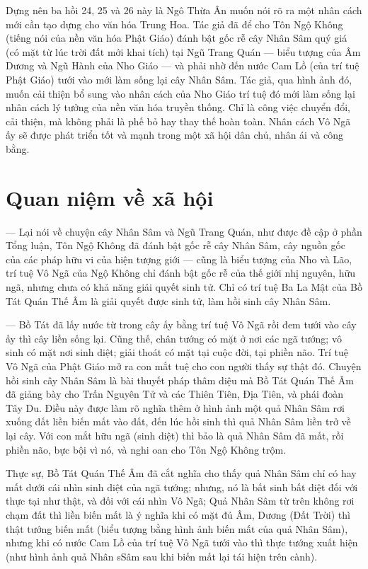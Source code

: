 Dựng nên ba hồi 24, 25 và 26 này là Ngô Thừa Ân muốn nói rõ ra một nhân cách mới cần tạo dựng cho văn hóa Trung Hoa. Tác giả đã để cho Tôn Ngộ Không (tiếng nói của nền văn hóa Phật Giáo) đánh bật gốc rễ cây Nhân Sâm quý giá (có mặt từ lúc trời đất mới khai tích) tại Ngũ Trang Quán — biểu tượng của Âm Dương và Ngũ Hành của Nho Giáo — và phải nhờ đến nước Cam Lồ (của trí tuệ Phật Giáo) tưới vào mới làm sống lại cây Nhân Sâm. Tác giả, qua hình ảnh đó, muốn cải thiện bổ sung vào nhân cách của Nho Giáo trí tuệ đó mới làm sống lại nhân cách lý tưởng của nền văn hóa truyền thống. Chỉ là công việc chuyển đổi, cải thiện, mà không phải là phế bỏ hay thay thế hoàn toàn. Nhân cách Vô Ngã ấy sẽ được phát triển tốt và mạnh trong một xã hội dân chủ, nhân ái và công bằng.

\section{Quan niệm về xã hội} %
\label{sec:24_25_26_xa_hoi}

— Lại nói về chuyện cây Nhân Sâm và Ngũ Trang Quán, như được đề cập ở phần Tổng luận, Tôn Ngộ Không đã đánh bật gốc rễ cây Nhân Sâm, cây nguồn gốc của các pháp hữu vi của hiện tượng giới — cũng là biểu tượng của Nho và Lão, trí tuệ Vô Ngã của Ngộ Không chỉ đánh bật gốc rễ của thế giới nhị nguyên, hữu ngã, nhưng chưa có khả năng giải quyết sinh tử. Chỉ có trí tuệ Ba La Mật của Bồ Tát Quán Thế Âm là giải quyết được sinh tử, làm hồi sinh cây Nhân Sâm.

— Bồ Tát đã lấy nước từ trong cây ấy bằng trí tuệ Vô Ngã rồi đem tưới vào cây ấy thì cây liền sống lại. Cũng thế, chân tướng có mặt ở nơi các ngã tướng; vô sinh có mặt nơi sinh diệt; giải thoát có mặt tại cuộc đời, tại phiền não. Trí tuệ Vô Ngã của Phật Giáo mở ra con mắt tuệ cho con người thấy sự thật đó. Chuyện hồi sinh cây Nhân Sâm là bài thuyết pháp thâm diệu mà Bồ Tát Quán Thế Âm đã giảng bày cho Trấn Nguyên Tử và các Thiên Tiên, Địa Tiên, và phái đoàn Tây Du. Điều này được làm rõ nghĩa thêm ở hình ảnh một quả Nhân Sâm rơi xuống đất liền biến mất vào đất, đến lúc hồi sinh thì quả Nhân Sâm liền trở về lại cây. Với con mắt hữu ngã (sinh diệt) thì bảo là quả Nhân Sâm đã mất, rồi phiền não, bực bội vì nó, và nghi oan cho Tôn Ngộ Không trộm.

Thực sự, Bồ Tát Quán Thế Âm đã cắt nghĩa cho thấy quả Nhân Sâm chỉ có hay mất dưới cái nhìn sinh diệt của ngã tướng; nhưng, nó là bất sinh bất diệt đối với thực tại như thật, và đối với cái nhìn Vô Ngã; Quả Nhân Sâm từ trên không rơi chạm đất thì liền biến mất là ý nghĩa khi có mặt đủ Âm, Dương (Đất Trời) thì thật tướng biến mất (biểu tượng bằng hình ảnh biến mất của quả Nhân Sâm), nhưng khi có nước Cam Lồ của trí tuệ Vô Ngã tưới vào thì thực tướng xuất hiện (như hình ảnh quả Nhân sSâm sau khi biến mất lại tái hiện trên cành).

